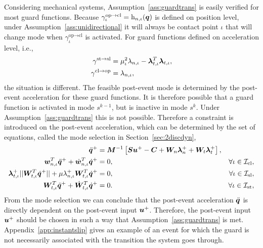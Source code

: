 \documentclass[../DC2019003Bouma.tex]{subfiles}
\begin{document}
\begin{sloppypar}
\begin{myremark}
Considering mechanical systems, Assumption~\ref{ass:guardtrans} is easily verified for most guard functions. Because $\gamma^{\text{op}\rightarrow\text{cl}}_{\iota} = \mathrm{h}_{n,\iota}({\boldsymbol{q}})$ is defined on position level, under Assumption~\ref{ass:unidirectional} it will always be contact point $\iota$ that will change mode when $\gamma^{\text{op}\rightarrow\text{cl}}_{\iota}$ is activated. For guard functions defined on acceleration level, i.e.,
\begin{align*}
\gamma^{\textnormal{st}\rightarrow\textnormal{sl}} &= \mu_\iota^2\lambda_{n,\iota} - \boldsymbol{\lambda}^T_{t,\iota}\boldsymbol{\lambda}_{t,\iota},\\
\gamma^{\textnormal{cl}\rightarrow\textnormal{op}} &= \lambda_{n,\iota},
\end{align*}
the situation is different. The feasible post-event mode is determined by the post-event acceleration for these guard functions. It is therefore possible that a guard function is activated in mode $s^{k-1}$, but is inactive in mode $s^{k}$. Under Assumption~\ref{ass:guardtrans} this is not possible. Therefore a constraint is introduced on the post-event acceleration, which can be determined by the set of equations, called the mode selection in Section~\ref{sec:2discdyn},
\begin{align}
\ddot{{\boldsymbol{q}}}^+ &= {\boldsymbol{M}}^{-1}\left[{\boldsymbol{S}}{\boldsymbol{u}}^+ - {\boldsymbol{C}} + {\boldsymbol{W}}_{n}\boldsymbol{\lambda}^+_{n} + {\boldsymbol{W}}_{t}\boldsymbol{\lambda}^+_{t}\right], &  \nonumber\\
{\boldsymbol{w}}^T_{n,\iota}\ddot{{\boldsymbol{q}}}^+ + \dot{{\boldsymbol{w}}}^T_{n,\iota}\dot{{\boldsymbol{q}}}^+ &= 0, & \forall \iota\in\mathcal{I}_{\text{cl}},\nonumber\\
\boldsymbol{\lambda}^+_{t,\iota}||{\boldsymbol{W}}_{t,\iota}^T\dot{{\boldsymbol{q}}}^+|| + \mu\lambda^+_{n,\iota}{\boldsymbol{W}}_{t,\iota}^T\dot{{\boldsymbol{q}}}^+ &= 0, & \forall \iota\in\mathcal{I}_{\text{sl}},\nonumber\\
{\boldsymbol{W}}^T_{t,\iota}\ddot{{\boldsymbol{q}}}^+ + \dot{{\boldsymbol{W}}}^T_{t,\iota}\dot{{\boldsymbol{q}}}^+ &= 0. & \forall \iota\in\mathcal{I}_{\text{st}},\nonumber
\end{align}
From the mode selection we can conclude that the post-event acceleration $\ddot{{\boldsymbol{q}}}$ is directly dependent on the post-event input ${\boldsymbol{u}}^+$. Therefore, the post-event input ${\boldsymbol{u}}^+$ should be chosen in such a way that Assumption~\ref{ass:guardtrans} is met. Appendix~\ref{app:instantslip} gives an example of an event for which the guard is not necessarily associated with the transition the system goes through.
\end{myremark}
\end{sloppypar}
\end{document}
